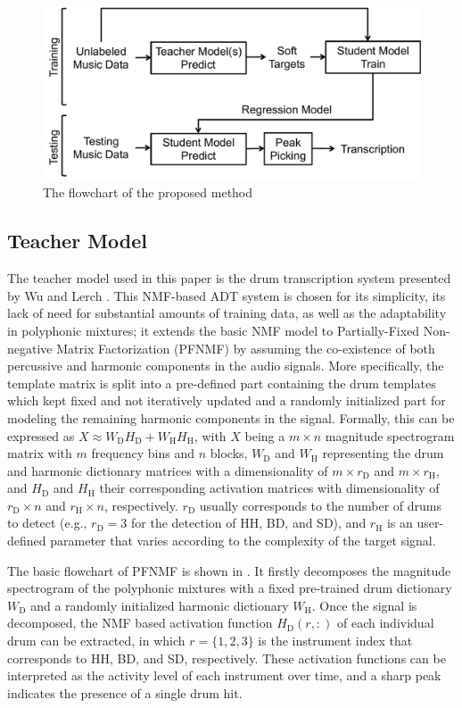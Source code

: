 \documentclass{article}
\begin{document}
\begin{figure}
\centering
\includegraphics[width = 8 cm]{./figs/flowchart.pdf}
\caption{The flowchart of the proposed method}
\label{fig:flowchart}
\end{figure}

\subsection{Teacher Model}
The teacher model used in this paper is the drum transcription system presented by Wu and Lerch \cite{Wu2015a}. This NMF-based ADT system is chosen for its simplicity, its lack of need for substantial amounts of training data, as well as the adaptability in polyphonic mixtures; it extends the basic NMF model to Partially-Fixed Non-negative Matrix Factorization (PFNMF) by assuming the co-existence of both percussive and harmonic components in the audio signals. More specifically, the template matrix is split into a pre-defined part containing the drum templates which kept fixed and not iteratively updated and a randomly initialized part for modeling the remaining harmonic components in the signal. Formally, this can be expressed as $X \approx W_\mathrm{D}H_\mathrm{D} + W_\mathrm{H}H_\mathrm{H}$, with $X$ being a $m \times n$ magnitude spectrogram matrix with $m$ frequency bins and $n$ blocks, $W_\mathrm{D}$ and $W_\mathrm{H}$ representing the drum and harmonic dictionary matrices with a dimensionality of $m \times r_\mathrm{D}$ and $m \times r_\mathrm{H}$, and $H_\mathrm{D}$ and $H_\mathrm{H}$ their corresponding activation matrices with dimensionality of $r_\mathrm{D} \times n$ and $r_\mathrm{H} \times n$, respectively. $r_\mathrm{D}$ usually corresponds to the number of drums to detect (e.g., $r_\mathrm{D} = 3$ for the detection of HH, BD, and SD), and $r_\mathrm{H}$ is an user-defined parameter that varies according to the complexity of the target signal. 

The basic flowchart of PFNMF is shown in . It firstly decomposes the magnitude spectrogram of the polyphonic mixtures with a fixed pre-trained drum dictionary $W_\mathrm{D}$ and a randomly initialized harmonic dictionary $W_\mathrm{H}$. Once the signal is decomposed, the NMF based activation function $H_\mathrm{D}(r, :)$ of each individual drum can be extracted, in which $r = \{1, 2, 3\}$ is the instrument index that corresponds to HH, BD, and SD, respectively. These activation functions can be interpreted as the activity level of each instrument over time, and a sharp peak indicates the presence of a single drum hit.
\end{document}
